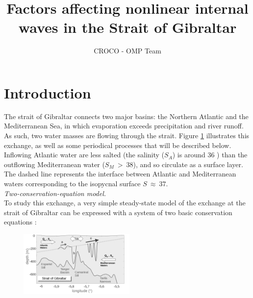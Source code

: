 \documentclass[a4paper,12pt]{article}
\title{Factors affecting nonlinear internal waves in the Strait of Gibraltar}
\author{CROCO - OMP Team}
\begin{document}

\hypersetup{pdfborder=0 0 0}
\maketitle
\setcounter{tocdepth}{2}

\tableofcontents
\newpage

\section{Introduction}

The strait of Gibraltar connects two major basins: the Northern Atlantic and the Mediterranean Sea, in which evaporation exceeds precipitation and river runoff. As such, two water masses are flowing through the strait. Figure \ref{scheme_GBR} illustrates this exchange, as well as some periodical processes that will be described below. Inflowing Atlantic water are less salted (the salinity ($S_A$) is around 36 ) than the outflowing Mediterranean water ($S_M\ >\ 38$), and so circulate as a surface layer. The dashed line represents the interface between Atlantic and Mediterranean waters corresponding to the isopycnal surface $S\ \approx\ 37$.\\

\textit{Two-conservation-equation model.}\\
To study this exchange, a very simple steady-state model of the exchange at the strait of Gibraltar can be expressed with a system of two basic conservation equations :
\begin{figure}
 \centering
 \includegraphics[width=0.51\textwidth]{schema_echange.png}
\label{scheme_GBR}
\end{figure}
\end{document}
